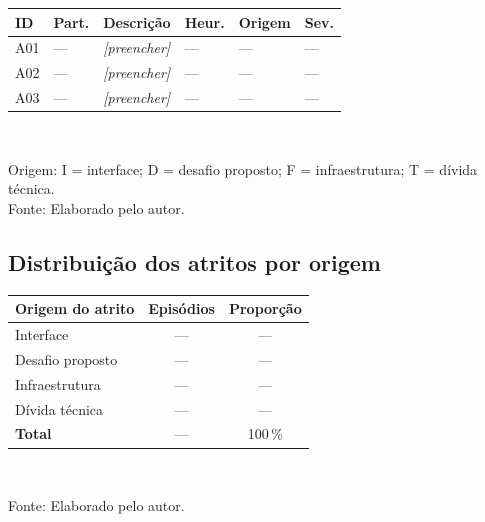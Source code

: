 \begin{quadro}[htb]
\centering
\caption{Episódios de atrito registrados na Rodada 1}
\label{quad:res_atritos_r1}
\footnotesize
\begin{tabular}{p{1.0cm} p{1.0cm} p{4.0cm} p{1.2cm} p{1.8cm} p{1.2cm}}
\toprule
\textbf{ID} & \textbf{Part.} & \textbf{Descrição} & \textbf{Heur.} &
\textbf{Origem} & \textbf{Sev.} \\
\midrule
A01 & --- & \textit{[preencher]} & --- & --- & --- \\
A02 & --- & \textit{[preencher]} & --- & --- & --- \\
A03 & --- & \textit{[preencher]} & --- & --- & --- \\
\bottomrule
\end{tabular}
\\[4pt]
\begin{flushleft}
Origem: I = interface; D = desafio proposto; F = infraestrutura;
T = dívida técnica.\\
Fonte: Elaborado pelo autor.
\end{flushleft}
\end{quadro}

\subsection{Distribuição dos atritos por origem}


\begin{quadro}[htb]
\centering
\caption{Distribuição dos episódios de atrito por origem --- Rodada 1}
\label{quad:res_origem_r1}
\begin{tabular}{p{5.4cm} c c}
\toprule
\textbf{Origem do atrito} & \textbf{Episódios} & \textbf{Proporção} \\
\midrule
Interface & --- & --- \\
Desafio proposto & --- & --- \\
Infraestrutura & --- & --- \\
Dívida técnica & --- & --- \\
\midrule
\textbf{Total} & --- & 100\,\% \\
\bottomrule
\end{tabular}
\\[4pt]
\begin{flushleft}
Fonte: Elaborado pelo autor.
\end{flushleft}
\end{quadro}

